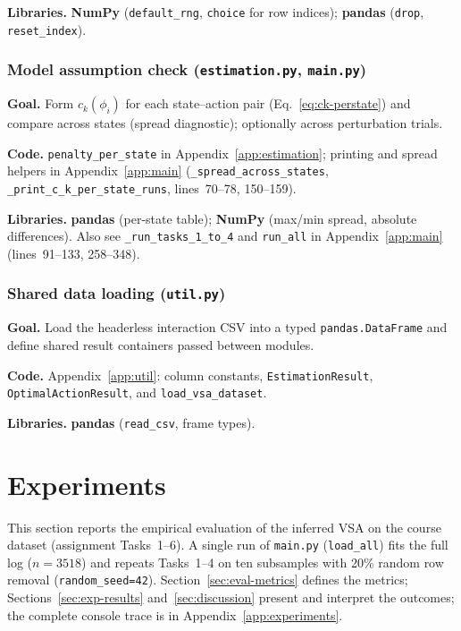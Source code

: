\documentclass[11pt,a4paper]{article}
\begin{document}
\textbf{Libraries.}\; \textbf{NumPy} (\texttt{default\_rng}, \texttt{choice} for row
indices); \textbf{pandas} (\texttt{drop}, \texttt{reset\_index}).

\subsubsection{Model assumption check (\texttt{estimation.py}, \texttt{main.py})}\label{sec:impl-task6}

\textbf{Goal.}\; Form $c_k(\phi_i)$ for each state--action pair
(Eq.~\eqref{eq:ck-perstate}) and compare across states (spread diagnostic);
optionally across perturbation trials.

\textbf{Code.}\; \texttt{penalty\_per\_state} in Appendix~\ref{app:estimation};
printing and spread helpers in Appendix~\ref{app:main}
(\texttt{\_spread\_across\_states}, \texttt{\_print\_c\_k\_per\_state\_runs},
lines~70--78, 150--159).

\textbf{Libraries.}\; \textbf{pandas} (per-state table); \textbf{NumPy} (max/min spread,
absolute differences).
Also see \texttt{\_run\_tasks\_1\_to\_4} and \texttt{run\_all} in
Appendix~\ref{app:main} (lines~91--133, 258--348).

\subsubsection{Shared data loading (\texttt{util.py})}\label{sec:impl-util}

\textbf{Goal.}\; Load the headerless interaction CSV into a typed
\texttt{pandas.DataFrame} and define shared result containers passed between modules.

\textbf{Code.}\; Appendix~\ref{app:util}: column constants,
\texttt{EstimationResult}, \texttt{OptimalActionResult}, and
\texttt{load\_vsa\_dataset}.

\textbf{Libraries.}\; \textbf{pandas} (\texttt{read\_csv}, frame types).

\fussy

\section{Experiments}\label{sec:experiments}

This section reports the empirical evaluation of the inferred VSA on the course
dataset (assignment Tasks~1--6).
A single run of \texttt{main.py} (\texttt{load\_all}) fits the full log
($n=3518$) and repeats Tasks~1--4 on ten subsamples with 20\% random row removal
(\texttt{random\_seed=42}).
Section~\ref{sec:eval-metrics} defines the metrics;
Sections~\ref{sec:exp-results} and~\ref{sec:discussion} present and interpret the
outcomes; the complete console trace is in Appendix~\ref{app:experiments}.
\end{document}

